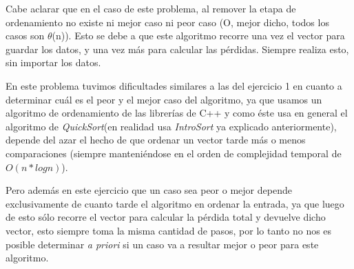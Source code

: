 Cabe aclarar que en el caso de este problema, al remover la etapa de ordenamiento no existe ni mejor caso ni peor caso (O, mejor dicho, todos los casos son $\theta$(n)). Esto se debe a que este algoritmo recorre una vez el vector para guardar los datos, y una vez más para calcular las pérdidas. Siempre realiza esto, sin importar los datos.

En este problema tuvimos dificultades similares a las del ejercicio 1 en cuanto a determinar cuál es el peor y el mejor caso del algoritmo, ya que usamos un algoritmo de ordenamiento de las librerías de C++ y como éste usa en general el algoritmo de \emph{QuickSort}(en realidad usa \emph{IntroSort} ya explicado anteriormente), depende del azar el hecho de que ordenar un vector tarde más o menos comparaciones (siempre manteniéndose en el orden de complejidad temporal de $O(n * log n)$).

Pero además en este ejercicio que un caso sea peor o mejor depende exclusivamente de cuanto tarde el algoritmo en ordenar la entrada, ya que luego de esto sólo recorre el vector para calcular la pérdida total y devuelve dicho vector, esto siempre toma la misma cantidad de pasos, por lo tanto no nos es posible determinar \emph{a priori} si un caso va a resultar mejor o peor para este algoritmo.


